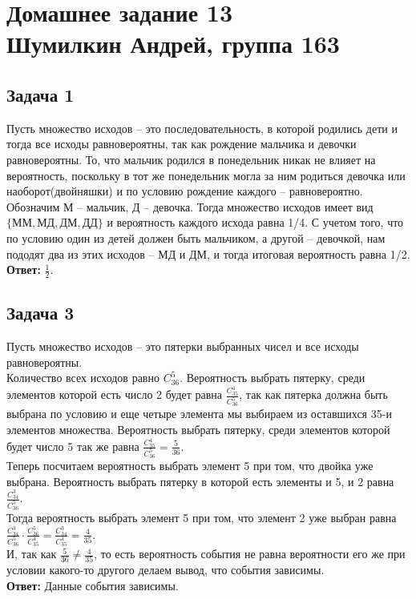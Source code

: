 

	\section{Домашнее задание 13\\ Шумилкин Андрей, группа 163} 
	\subsection{Задача 1}
	Пусть  множество исходов -- это последовательность, в которой родились дети и тогда все исходы равновероятны, так как рождение мальчика и девочки равновероятны. То, что мальчик родился в понедельник никак не влияет на вероятность, поскольку в тот же понедельник могла за ним родиться девочка или наоборот(двойняшки) и по условию рождение каждого -- равновероятно. Обозначим М -- мальчик, Д -- девочка. Тогда множество исходов имеет вид $\{ММ, МД, ДМ, ДД\}$ и вероятность каждого исхода равна 1/4. С учетом того, что по условию один из детей должен быть мальчиком, а другой -- девочкой, нам пододят два из этих исходов -- МД и ДМ, и тогда итоговая вероятность равна 1/2.\\
	\textbf{Ответ:} $\frac{1}{2}$.
	
	\subsection{Задача 3}
	Пусть множество исходов -- это пятерки выбранных чисел и все исходы равновероятны. \\
	Количество всех исходов равно $C_{36}^{5}$.
	Вероятность выбрать пятерку, среди элементов которой есть число 2 будет равна $\frac{C_{35}^{4}}{C_{36}^{5}}$, так как пятерка должна быть выбрана по условию и еще четыре элемента мы выбираем из оставшихся 35-и элементов множества. Вероятность выбрать пятерку, среди элементов которой будет число 5 так же равна $\frac{C_{35}^{4}}{C_{36}^{5}} = \frac{5}{36}$.\\
	Теперь посчитаем вероятность выбрать элемент 5 при том, что двойка уже выбрана. Вероятность выбрать пятерку в которой есть элементы и 5, и 2 равна $\frac{C_{34}^{3}}{C_{36}^{5}}$. \\
	Тогда вероятность выбрать элемент 5 при том, что элемент 2 уже выбран равна $\frac{C_{34}^{3}}{C_{36}^{5}} \cdot \frac{C_{36}^{5}}{C_{35}^{4}} = \frac{C_{34}^{3}}{C_{35}^{4}} = \frac{4}{35}$.\\
	И, так как $\frac{5}{36} \not= \frac{4}{35}$, то есть вероятность события не равна вероятности его же при условии какого-то другого делаем вывод, что события зависимы. \\
	\textbf{Ответ:} Данные события зависимы.
	
